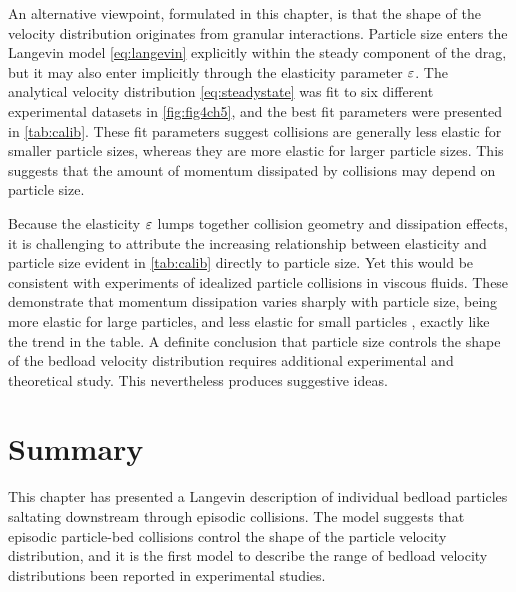 An alternative viewpoint, formulated in this chapter, is that the shape of the velocity distribution originates from granular interactions.
Particle size enters the Langevin model \DIFaddbegin {}\DIFaddend \ref{eq:langevin} explicitly within the steady component of the drag, but it may also enter implicitly through the elasticity parameter $\varepsilon$.
The analytical velocity distribution \DIFaddbegin {}\DIFaddend \ref{eq:steadystate} was fit to six different experimental datasets in \DIFdelbegin {}\DIFdelend \DIFaddbegin {}\DIFaddend \ref{fig:fig4ch5}, and the best fit parameters \DIFdelbegin {}\DIFdelend were presented in \DIFdelbegin {}\DIFdelend \DIFaddbegin {}\DIFaddend \ref{tab:calib}.
These fit parameters suggest collisions are generally less elastic for smaller particle sizes, whereas they are more elastic for larger particle sizes. This suggests that the amount of momentum dissipated by collisions may depend on particle size.

Because the elasticity $\varepsilon$ lumps together collision geometry and dissipation effects, it is challenging to attribute the increasing relationship between elasticity and particle size evident in \DIFdelbegin {}\DIFdelend \DIFaddbegin {}\DIFaddend \ref{tab:calib} directly to particle size.
Yet this would be consistent with experiments of idealized particle collisions in viscous fluids. These demonstrate that momentum dissipation varies sharply with particle size, being more elastic for large particles, and less elastic for small particles \citep{Joseph2001,Yang2006,Schmeeckle2001}, exactly like the trend in the table.
A definite conclusion that particle size controls the shape of the bedload velocity distribution requires additional experimental and theoretical study. This \DIFdelbegin {}\DIFdelend \DIFaddbegin {}\DIFaddend nevertheless produces suggestive ideas.

\section{Summary}
\label{sec:langconclusion}
This chapter has presented a Langevin description of individual bedload particles saltating downstream through episodic collisions.
The model suggests that episodic particle-bed collisions control the shape of the particle velocity distribution, and it is the first model to describe the \DIFdelbegin {}\DIFdelend range of bedload velocity distributions \DIFdelbegin {}\DIFdelend \DIFaddbegin {}\DIFaddend been reported in experimental studies.

